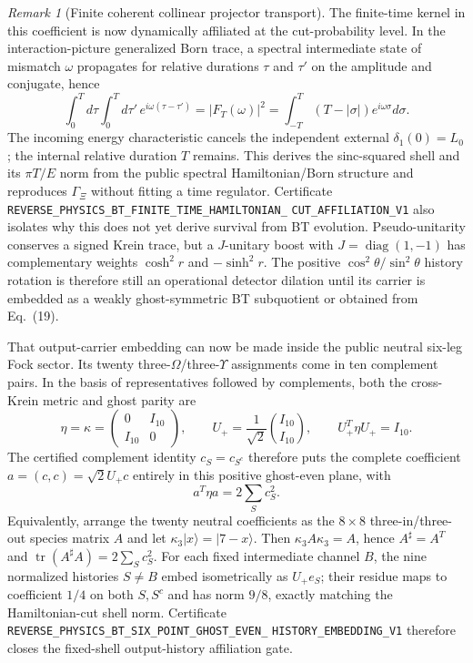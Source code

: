 \documentclass[11pt]{article}
\theoremstyle{definition}
\theoremstyle{remark}
\newtheorem{remark}[theorem]{Remark}
\begin{document}
\begin{remark}[Finite coherent collinear projector transport]
The finite-time kernel in this coefficient is now dynamically affiliated at
the cut-probability level.  In the interaction-picture generalized Born
trace, a spectral intermediate state of mismatch $\omega$ propagates for
relative durations $\tau$ and $\tau'$ on the amplitude and conjugate, hence
\[
 \int_0^Td\tau\int_0^Td\tau'\,e^{i\omega(\tau-\tau')}
 =|F_T(\omega)|^2
 =\int_{-T}^T(T-|\sigma|)e^{i\omega\sigma}d\sigma.
\]
The incoming energy characteristic cancels the independent external
$\delta_1(0)=L_0$; the internal relative duration $T$ remains.  This derives
the sinc-squared shell and its $\pi T/E$ norm from the public spectral
Hamiltonian/Born structure and reproduces $\Gamma_\Xi$ without fitting a time
regulator.  Certificate
\texttt{REVERSE\_PHYSICS\_BT\_FINITE\_TIME\_HAMILTONIAN\_}
\allowbreak\texttt{CUT\_AFFILIATION\_V1}
also isolates why this does not yet derive survival from BT evolution.
Pseudo-unitarity conserves a signed Krein trace, but a $J$-unitary boost with
$J=\operatorname{diag}(1,-1)$ has complementary weights $\cosh^2r$ and
$-\sinh^2r$.  The positive $\cos^2\theta/\sin^2\theta$ history rotation is
therefore still an operational detector dilation until its carrier is
embedded as a weakly ghost-symmetric BT subquotient or obtained from
Eq.~(19).

That output-carrier embedding can now be made inside the public neutral
six-leg Fock sector.  Its twenty three-$\Omega$/three-$\Upsilon$ assignments
come in ten complement pairs.  In the basis of representatives followed by
complements, both the cross-Krein metric and ghost parity are
\[
 \eta=\kappa=
 \begin{pmatrix}0&I_{10}\\I_{10}&0\end{pmatrix},
 \qquad
 U_+=\frac1{\sqrt2}\binom{I_{10}}{I_{10}},
 \qquad U_+^T\eta U_+=I_{10}.
\]
The certified complement identity $c_S=c_{S^c}$ therefore puts the complete
coefficient $a=(c,c)=\sqrt2U_+c$ entirely in this positive ghost-even plane,
with
\[
 a^T\eta a=2\sum_Sc_S^2.
\]
Equivalently, arrange the twenty neutral coefficients as the $8\times8$
three-in/three-out species matrix $A$ and let
$\kappa_3|x\rangle=|7-x\rangle$.  Then
$\kappa_3A\kappa_3=A$, hence $A^\sharp=A^T$ and
$\operatorname{tr}(A^\sharp A)=2\sum_Sc_S^2$.  For each fixed intermediate
channel $B$, the nine normalized histories $S\ne B$ embed isometrically as
$U_+e_S$; their residue maps to coefficient $1/4$ on both $S,S^c$ and has
norm $9/8$, exactly matching the Hamiltonian-cut shell norm.  Certificate
\texttt{REVERSE\_PHYSICS\_BT\_SIX\_POINT\_GHOST\_EVEN\_}
\allowbreak\texttt{HISTORY\_EMBEDDING\_V1}
therefore closes the fixed-shell output-history affiliation gate.


\end{remark}
\end{document}
